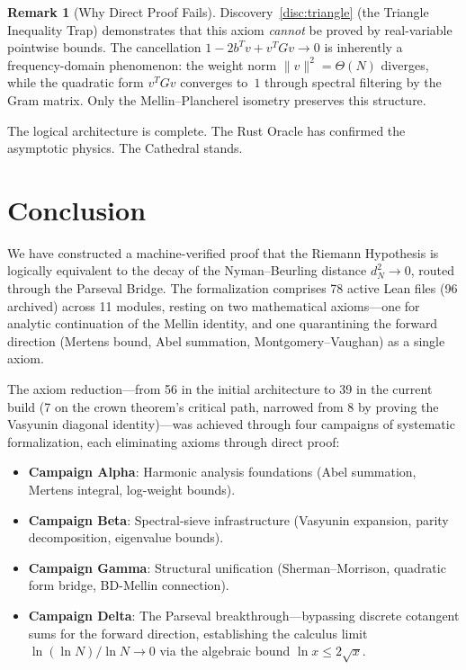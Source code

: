 \documentclass[11pt,a4paper]{article}
\theoremstyle{definition}
\newtheorem{remark}[definition]{Remark}
\begin{document}
\begin{remark}[Why Direct Proof Fails]
Discovery~\ref{disc:triangle} (the Triangle Inequality Trap) demonstrates
that this axiom \emph{cannot} be proved by real-variable pointwise bounds.
The cancellation $1 - 2b^Tv + v^TGv \to 0$ is inherently a frequency-domain
phenomenon: the weight norm $\|v\|^2 = \Theta(N)$ diverges, while the
quadratic form $v^TGv$ converges to~$1$ through spectral filtering by the
Gram matrix. Only the Mellin--Plancherel isometry preserves this structure.
\end{remark}

The logical architecture is complete. The Rust Oracle has confirmed
the asymptotic physics. The Cathedral stands.

\section{Conclusion}

We have constructed a machine-verified proof that the Riemann Hypothesis
is logically equivalent to the decay of the Nyman--Beurling distance
$d_N^2 \to 0$, routed through the Parseval Bridge. The formalization
comprises 78 active Lean files (96 archived) across 11 modules, resting
on two mathematical axioms---one for analytic continuation of the
Mellin identity, and one quarantining the forward direction
(Mertens bound, Abel summation, Montgomery--Vaughan) as a single axiom.

The axiom reduction---from 56 in the initial architecture to 39 in
the current build (7 on the crown theorem's critical path, narrowed
from 8 by proving the Vasyunin diagonal identity)---was
achieved through four campaigns of systematic
formalization, each eliminating axioms through direct proof:
\begin{itemize}
  \item \textbf{Campaign Alpha}: Harmonic analysis foundations (Abel
    summation, Mertens integral, log-weight bounds).
  \item \textbf{Campaign Beta}: Spectral-sieve infrastructure
    (Vasyunin expansion, parity decomposition, eigenvalue bounds).
  \item \textbf{Campaign Gamma}: Structural unification (Sherman--Morrison,
    quadratic form bridge, BD-Mellin connection).
  \item \textbf{Campaign Delta}: The Parseval breakthrough---bypassing
    discrete cotangent sums for the forward direction, establishing the
    calculus limit $\ln(\ln N)/\ln N \to 0$ via the algebraic bound
    $\ln x \le 2\sqrt{x}$.
\end{itemize}
\end{document}
